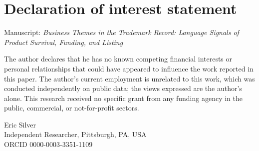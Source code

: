 \documentclass[11pt]{article}
\begin{document}
\section*{Declaration of interest statement}

\noindent Manuscript: \emph{Business Themes in the Trademark Record:
Language Signals of Product Survival, Funding, and Listing}

\bigskip
\noindent The author declares that he has no known competing financial
interests or personal relationships that could have appeared to
influence the work reported in this paper. The author's current
employment is unrelated to this work, which was conducted independently
on public data; the views expressed are the author's alone. This
research received no specific grant from any funding agency in the
public, commercial, or not-for-profit sectors.

\bigskip
\noindent Eric Silver\\
Independent Researcher, Pittsburgh, PA, USA\\
ORCID 0000-0003-3351-1109
\end{document}
